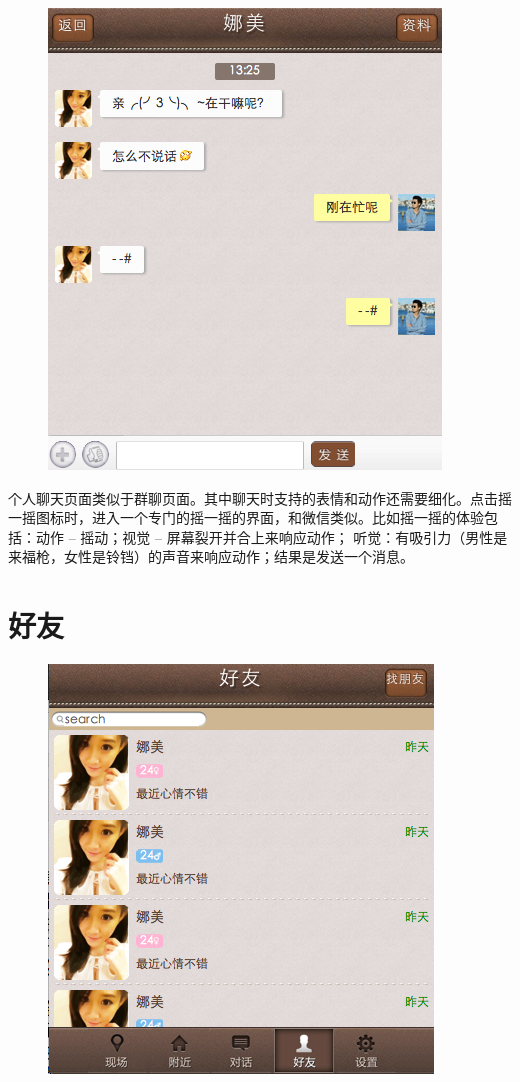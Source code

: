\documentclass[cs4size]{ctexartutf8}
\begin{document}
\begin{figure}[H]
\centering
\includegraphics[scale=0.5]{./7.png}
\end{figure}

个人聊天页面类似于群聊页面。其中聊天时支持的表情和动作还需要细化。点击摇一摇图标时，进入一个专门的摇一摇的界面，和微信类似。比如摇一摇的体验包括：动作 – 摇动；视觉 – 屏幕裂开并合上来响应动作； 听觉：有吸引力（男性是来福枪，女性是铃铛）的声音来响应动作；结果是发送一个消息。



\section{好友}

\begin{figure}[H]
\centering
\includegraphics[scale=0.5]{./8.png}
\end{figure}
\end{document}
